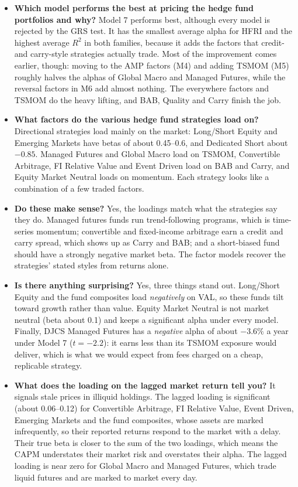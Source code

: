 \documentclass[11pt]{article}
\begin{document}
\begin{itemize}
\item \textbf{Which model performs the best at pricing the hedge fund portfolios and why?}
Model 7 performs best, although every model is rejected by the GRS test. It has the
smallest average alpha for HFRI and the highest average $R^2$ in both families, because it
adds the factors that credit- and carry-style strategies actually trade. Most of the
improvement comes earlier, though: moving to the AMP factors (M4) and adding TSMOM (M5)
roughly halves the alphas of Global Macro and Managed Futures, while the reversal factors
in M6 add almost nothing. The everywhere factors and TSMOM do the heavy lifting, and BAB,
Quality and Carry finish the job.

\item \textbf{What factors do the various hedge fund strategies load on?} Directional
strategies load mainly on the market: Long/Short Equity and Emerging Markets have betas of
about 0.45--0.6, and Dedicated Short about $-0.85$. Managed Futures and Global Macro load on
TSMOM, Convertible Arbitrage, FI Relative Value and Event Driven load on BAB and Carry, and
Equity Market Neutral loads on momentum. Each strategy looks like a combination of a few
traded factors.

\item \textbf{Do these make sense?} Yes, the loadings match what the strategies say they do.
Managed futures funds run trend-following programs, which is time-series momentum;
convertible and fixed-income arbitrage earn a credit and carry spread, which shows up as
Carry and BAB; and a short-biased fund should have a strongly negative market beta. The
factor models recover the strategies' stated styles from returns alone.

\item \textbf{Is there anything surprising?} Yes, three things stand out. Long/Short
Equity and the fund composites load \emph{negatively} on VAL, so these funds tilt toward
growth rather than value. Equity Market Neutral is not market neutral (beta about 0.1) and keeps a
significant alpha under every model. Finally, DJCS Managed Futures has a \emph{negative}
alpha of about $-3.6\%$ a year under Model 7 ($t=-2.2$): it earns less than its TSMOM
exposure would deliver, which is what we would expect from fees charged on a cheap,
replicable strategy.

\item \textbf{What does the loading on the lagged market return tell you?} It signals stale
prices in illiquid holdings. The lagged loading is significant (about 0.06--0.12) for
Convertible Arbitrage, FI Relative Value, Event Driven, Emerging Markets and the fund
composites, whose assets are marked infrequently, so their reported returns respond to the
market with a delay. Their true beta is closer to the sum of the two loadings, which means
the CAPM understates their market risk and overstates their alpha. The lagged loading is
near zero for Global Macro and Managed Futures, which trade liquid futures and are marked
to market every day.
\end{itemize}
\end{document}

